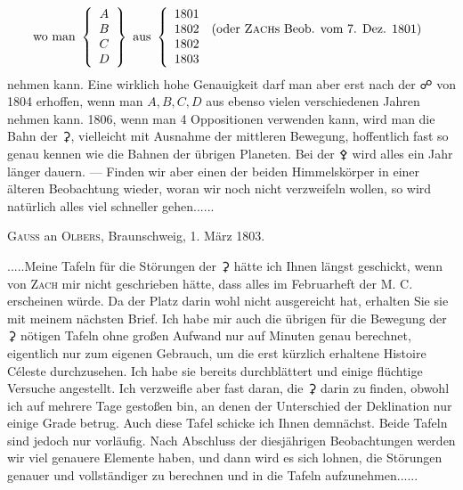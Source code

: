 \[\textstyle
\text{wo man }\left\{\begin{array}{c}A\\B\\C\\D\end{array}\right\}
\text{ aus }\left\{\begin{array}{ll}
1801&\\
1802&\text{(oder \textsc{Zach}s Beob. vom 7. Dez. 1801)}\\
1802&\\
1803&
\end{array}\right.
\]
nehmen kann. Eine wirklich hohe Genauigkeit darf man aber erst nach der {\AstroSymbols ☍} von 1804 erhoffen, wenn man \(A,B,C,D\) aus ebenso vielen verschiedenen Jahren nehmen kann. 1806, wenn man 4 Oppositionen verwenden kann, wird man die Bahn der {\AstroSymbols ⚳}, vielleicht mit Ausnahme der mittleren Bewegung, hoffentlich fast so genau kennen wie die Bahnen der übrigen Planeten. Bei der {\AstroSymbols ⚴} wird alles ein Jahr länger dauern. — Finden wir aber einen der beiden Himmelskörper in einer älteren Beobachtung wieder, woran wir noch nicht verzweifeln wollen, so wird natürlich alles viel schneller gehen.\quad.\quad.\quad.\quad.\quad.

\begin{center}
\textsc{Gauss} an \textsc{Olbers}, Braunschweig, 1. März 1803.
\end{center}
\noindent\hspace*{\parindent}.\quad.\quad.\quad.\quad.\quad Meine Tafeln für die Störungen der {\AstroSymbols ⚳} hätte ich Ihnen längst geschickt, wenn von \textsc{Zach} mir nicht geschrieben hätte, dass alles im Februarheft der M. C. erscheinen würde. Da der Platz darin wohl nicht ausgereicht hat, erhalten Sie sie mit meinem nächsten Brief. Ich habe mir auch die übrigen für die Bewegung der {\AstroSymbols ⚳} nötigen Tafeln ohne großen Aufwand nur auf Minuten genau berechnet, eigentlich nur zum eigenen Gebrauch, um die erst kürzlich erhaltene Histoire Céleste durchzusehen. Ich habe sie bereits durchblättert und einige flüchtige Versuche angestellt. Ich verzweifle aber fast daran, die {\AstroSymbols ⚳} darin zu finden, obwohl ich auf mehrere Tage gestoßen bin, an denen der Unterschied der Deklination nur einige Grade betrug. Auch diese Tafel schicke ich Ihnen demnächst. Beide Tafeln sind jedoch nur vorläufig. Nach Abschluss der diesjährigen Beobachtungen werden wir viel genauere Elemente haben, und dann wird es sich lohnen, die Störungen genauer und vollständiger zu berechnen und in die Tafeln aufzunehmen.\quad.\quad.\quad.\quad.\quad.

